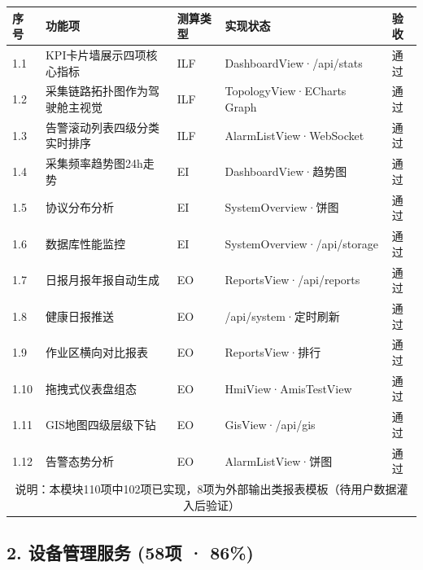 \documentclass[11pt,a4paper]{ctexart}
\begin{document}
\begin{longtable}{p{1cm}p{4cm}p{3cm}p{3cm}p{2.5cm}}
\toprule
\textbf{序号} & \textbf{功能项} & \textbf{测算类型} & \textbf{实现状态} & \textbf{验收} \\
\midrule
1.1 & KPI卡片墙展示四项核心指标 & ILF & DashboardView·/api/stats & \color{ok}通过 \\
1.2 & 采集链路拓扑图作为驾驶舱主视觉 & ILF & TopologyView·ECharts Graph & \color{ok}通过 \\
1.3 & 告警滚动列表四级分类实时排序 & ILF & AlarmListView·WebSocket & \color{ok}通过 \\
1.4 & 采集频率趋势图24h走势 & EI & DashboardView·趋势图 & \color{ok}通过 \\
1.5 & 协议分布分析 & EI & SystemOverview·饼图 & \color{ok}通过 \\
1.6 & 数据库性能监控 & EI & SystemOverview·/api/storage & \color{ok}通过 \\
1.7 & 日报月报年报自动生成 & EO & ReportsView·/api/reports & \color{ok}通过 \\
1.8 & 健康日报推送 & EO & /api/system·定时刷新 & \color{ok}通过 \\
1.9 & 作业区横向对比报表 & EO & ReportsView·排行 & \color{ok}通过 \\
1.10 & 拖拽式仪表盘组态 & EO & HmiView·AmisTestView & \color{ok}通过 \\
1.11 & GIS地图四级层级下钻 & EO & GisView·/api/gis & \color{ok}通过 \\
1.12 & 告警态势分析 & EO & AlarmListView·饼图 & \color{ok}通过 \\
\midrule
\multicolumn{5}{c}{说明：本模块110项中102项已实现，8项为外部输出类报表模板（待用户数据灌入后验证）} \\
\bottomrule
\end{longtable}

\subsection{2. 设备管理服务 (58项 · 86\%)}
\end{document}
